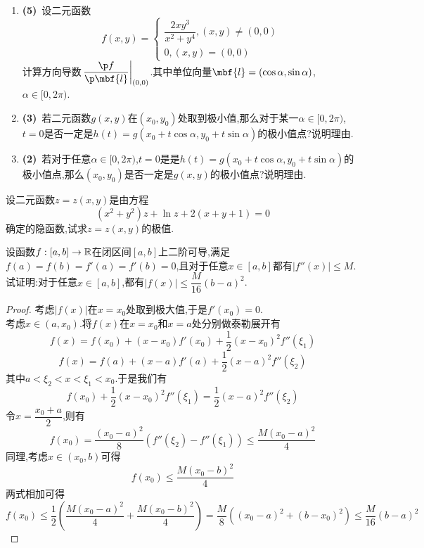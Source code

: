 \documentclass{ctexart}
\begin{document}
\begin{problem}[7.(10\songti{分})]
    \begin{enumerate}[label=\tbf{(\arabic*)}]
        \item \textbf{(5)}\ 设二元函数\[f(x,y)=\left\{\begin{array}{l}
                \dfrac{2xy^3}{x^2+y^4},(x,y)\neq(0,0)\\
                0,(x,y)=(0,0)
            \end{array}\right.\]计算方向导数$\left.\dfrac{\p f}{\p\mbf{l}}\right|_{(0,0)}$.其中单位向量$\mbf{l}=(\cos\alpha,\sin\alpha)$,$\alpha\in[0,2\pi)$.
        \item \textbf{(3)}\ 若二元函数$g(x,y)$在$(x_0,y_0)$处取到极小值,那么对于某一$\alpha\in[0,2\pi)$,$t=0$是否一定是$h(t)=g(x_0+t\cos\alpha,y_0+t\sin\alpha)$的极小值点?说明理由.
        \item \textbf{(2)}\ 若对于任意$\alpha\in[0,2\pi)$,$t=0$是是$h(t)=g(x_0+t\cos\alpha,y_0+t\sin\alpha)$的极小值点,那么$(x_0,y_0)$是否一定是$g(x,y)$的极小值点?说明理由.
    \end{enumerate}
\end{problem}
\begin{problem}[8.(15\songti{分})]
    设二元函数$z=z(x,y)$是由方程
    \[(x^2+y^2)z+\ln z+2(x+y+1)=0\]确定的隐函数,试求$z=z(x,y)$的极值.
\end{problem}
\begin{problem}[9.(10\songti{分})]
    设函数$f:[a,b]\to\mathbb{R}$在闭区间$[a,b]$上二阶可导,满足$f(a)=f(b)=f'(a)=f'(b)=0$,且对于任意$x\in[a,b]$都有$|f''(x)|\leqslant M$.试证明:对于任意$x\in[a,b]$,都有$|f(x)|\leqslant\dfrac{M}{16}(b-a)^2$.
\end{problem}
\begin{proof}
    考虑$|f(x)|$在$x=x_0$处取到极大值,于是$f'(x_0)=0$.\\
    考虑$x\in(a,x_0)$.将$f(x)$在$x=x_0$和$x=a$处分别做泰勒展开有
    \[f(x)=f(x_0)+(x-x_0)f'(x_0)+\dfrac{1}{2}(x-x_0)^2f''(\xi_1)\]
    \[f(x)=f(a)+(x-a)f'(a)+\dfrac{1}{2}(x-a)^2f''(\xi_2)\]
    其中$a<\xi_2<x<\xi_1<x_0$.于是我们有
    \[f(x_0)+\dfrac{1}{2}(x-x_0)^2f''(\xi_1)=\dfrac{1}{2}(x-a)^2f''(\xi_2)\]
    令$x=\dfrac{x_0+a}{2}$,则有
    \[f(x_0)=\dfrac{(x_0-a)^2}{8}\left(f''(\xi_2)-f''(\xi_1)\right)\leqslant\dfrac{M(x_0-a)^2}{4}\]
    同理,考虑$x\in(x_0,b)$可得
    \[f(x_0)\leqslant\dfrac{M(x_0-b)^2}{4}\]
    两式相加可得
    \[f(x_0)\leqslant\dfrac{1}{2}\left(\dfrac{M(x_0-a)^2}{4}+\dfrac{M(x_0-b)^2}{4}\right)=\dfrac{M}{8}\left((x_0-a)^2+(b-x_0)^2\right)\leqslant\dfrac{M}{16}(b-a)^2\]
\end{proof}
\end{document}
